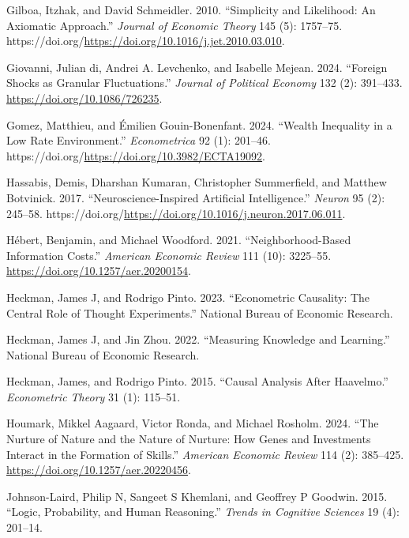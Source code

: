 \documentclass[
]{article}
\newlength{\cslhangindent}
\newenvironment{CSLReferences}[2] %
 {\begin{list}{}{%
  \setlength{\itemindent}{0pt}
  \setlength{\leftmargin}{0pt}
  \setlength{\parsep}{0pt}
  \ifodd #1
   \setlength{\leftmargin}{\cslhangindent}
   \setlength{\itemindent}{-1\cslhangindent}
  \fi
  \setlength{\itemsep}{#2\baselineskip}}}
 {\end{list}}
\begin{document}
\begin{CSLReferences}{1}{0}
Gilboa, Itzhak, and David Schmeidler. 2010. {``Simplicity and
Likelihood: An Axiomatic Approach.''} \emph{Journal of Economic Theory}
145 (5): 1757--75.
https://doi.org/\url{https://doi.org/10.1016/j.jet.2010.03.010}.

Giovanni, Julian di, Andrei A. Levchenko, and Isabelle Mejean. 2024.
{``Foreign Shocks as Granular Fluctuations.''} \emph{Journal of
Political Economy} 132 (2): 391--433.
\url{https://doi.org/10.1086/726235}.

Gomez, Matthieu, and Émilien Gouin-Bonenfant. 2024. {``Wealth Inequality
in a Low Rate Environment.''} \emph{Econometrica} 92 (1): 201--46.
https://doi.org/\url{https://doi.org/10.3982/ECTA19092}.

Hassabis, Demis, Dharshan Kumaran, Christopher Summerfield, and Matthew
Botvinick. 2017. {``Neuroscience-Inspired Artificial Intelligence.''}
\emph{Neuron} 95 (2): 245--58.
https://doi.org/\url{https://doi.org/10.1016/j.neuron.2017.06.011}.

Hébert, Benjamin, and Michael Woodford. 2021. {``Neighborhood-Based
Information Costs.''} \emph{American Economic Review} 111 (10):
3225--55. \url{https://doi.org/10.1257/aer.20200154}.

Heckman, James J, and Rodrigo Pinto. 2023. {``Econometric Causality: The
Central Role of Thought Experiments.''} National Bureau of Economic
Research.

Heckman, James J, and Jin Zhou. 2022. {``Measuring Knowledge and
Learning.''} National Bureau of Economic Research.

Heckman, James, and Rodrigo Pinto. 2015. {``Causal Analysis After
Haavelmo.''} \emph{Econometric Theory} 31 (1): 115--51.

Houmark, Mikkel Aagaard, Victor Ronda, and Michael Rosholm. 2024. {``The
Nurture of Nature and the Nature of Nurture: How Genes and Investments
Interact in the Formation of Skills.''} \emph{American Economic Review}
114 (2): 385--425. \url{https://doi.org/10.1257/aer.20220456}.

Johnson-Laird, Philip N, Sangeet S Khemlani, and Geoffrey P Goodwin.
2015. {``Logic, Probability, and Human Reasoning.''} \emph{Trends in
Cognitive Sciences} 19 (4): 201--14.


\end{CSLReferences}
\end{document}

